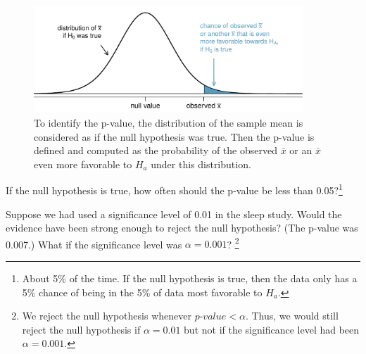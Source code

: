 \pagebreak

\begin{figure}[H]
   \centering
   \includegraphics[width=0.9\textwidth]{04/figures/pValueOneSidedSleepStudyExplained/pValueOneSidedSleepStudyExplained}
   \caption{To identify the p-value, the distribution of the sample mean is considered as if the null hypothesis was true. Then the p-value is defined and computed as the probability of the observed $\bar{x}$ or an $\bar{x}$ even more favorable to $H_a$ under this distribution.}
   \label{pValueOneSidedSleepStudyExplained}
\end{figure}


\pagebreak


\pagebreak

\begin{exercise}
If the null hypothesis is true, how often should the p-value be less than 0.05?\footnote{About 5\% of the time. If the null hypothesis is true, then the data only has a 5\% chance of being in the 5\% of data most favorable to $H_a$.}
\end{exercise}

\begin{exercise}
Suppose we had used a significance level of 0.01 in the sleep study. Would the evidence have been strong enough to reject the null hypothesis? (The p-value was 0.007.) What if the significance level was $\alpha = 0.001$? \footnote{We reject the null hypothesis whenever $p$-$value < \alpha$. Thus, we would still reject the null hypothesis if $\alpha = 0.01$ but not if the significance level had been $\alpha = 0.001$.}
\end{exercise}

